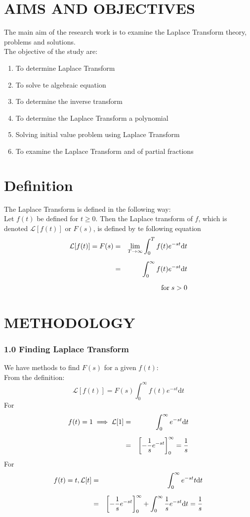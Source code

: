 \documentclass[12pt]{report}
\newcommand{\sps}{\\[0.2cm]}
\newcommand{\laplace}[1]{\mathcal{L}[#1]}
\begin{document}
	\section*{AIMS AND OBJECTIVES}
	The main aim of the research work is to examine the Laplace Transform theory, problems and solutions.\sps
	The objective of the study are:
	\begin{enumerate}
		\item To determine Laplace Transform
		
		\item To solve te algebraic equation
		
		\item To determine the inverse transform
		
		\item To determine the Laplace Transform a polynomial
		
		\item Solving initial value problem using Laplace Transform
		
		\item To examine the Laplace Transform and of partial fractions
	\end{enumerate}
	
	\section*{Definition}
	The Laplace Transform is defined in the following way:\sps
	Let $f(t)$ be defined for $t \geq 0$. Then the Laplace transform of $f$, which is denoted $\laplace{f(t)}$ or $F(s)$, is defined by te following equation
	\begin{eqnarray}
		\laplace{f(t)} = F(s) &=& \lim\limits_{T\rightarrow \infty}\int_0^T f(t)e^{-st}\mathrm{d}t\notag\sps
		&=&\int_0^\infty f(t)e^{-st}\mathrm{d}t\notag\sps
		&& \qquad \mathrm{for } \; s > 0\notag
	\end{eqnarray}
	
	\section*{METHODOLOGY}
	\subsubsection*{1.0 Finding Laplace Transform}
	We have methods to find $F(s)$ for a given $f(t)$:\sps
	From the definition:
	\begin{equation*}
		\laplace{f(t)} = F(s) \int_0^\infty f(t)e^{-st}\mathrm{d}t
	\end{equation*}
	For
	\begin{eqnarray}
		f(t) = 1 \implies \laplace{1} &=& \int_0^\infty e^{-st}\mathrm{d}t\notag\sps
		&=&\left[-\frac{1}{s}e^{-st}\right]_0^\infty = \frac{1}{s}\notag
	\end{eqnarray}
	For
	\begin{eqnarray}
		f(t) = t, \laplace{t} &=& \int_0^\infty e^{-st}t\mathrm{d}t\notag\sps
		&=&\left[-\frac{1}{s}e^{-st}\right]_0^\infty + \int_0^\infty \frac{1}{s}e^{-st}\mathrm{d}t = \frac{1}{s}\notag
	\end{eqnarray}
	
\end{document}
